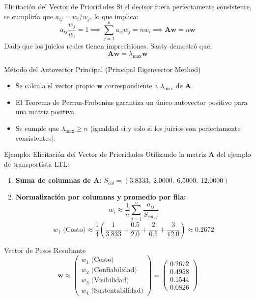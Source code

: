\documentclass[aspectratio=169, 10pt]{beamer}
\begin{document}
\begin{frame}{Elicitación del Vector de Prioridades}
    \small
    Si el decisor fuera perfectamente consistente, se cumpliría que $a_{ij} = w_i / w_j$, lo que implica:
    \[ a_{ij} \frac{w_j}{w_i} = 1 \implies \sum_{j=1}^n a_{ij} w_j = n w_i \implies \mathbf{A}\mathbf{w} = n\mathbf{w} \]
    Dado que los juicios reales tienen imprecisiones, Saaty demostró que:
    \[ \mathbf{A}\mathbf{w} = \lambda_{\max}\mathbf{w} \]
    \begin{block}{Método del Autovector Principal (Principal Eigenvector Method)}
        \scriptsize
        \begin{itemize}
            \item Se calcula el vector propio $\mathbf{w}$ correspondiente a $\lambda_{\max}$ de $\mathbf{A}$.
            \item El Teorema de Perron-Frobenius garantiza un único autovector positivo para una matriz positiva.
            \item Se cumple que $\lambda_{\max} \ge n$ (igualdad si y solo si los juicios son perfectamente consistentes).
        \end{itemize}
    \end{block}
\end{frame}

\begin{frame}{Ejemplo: Elicitación del Vector de Prioridades}
    Utilizando la matriz $\mathbf{A}$ del ejemplo de transportista LTL:
    \begin{enumerate}
        \item \textbf{Suma de columnas de $\mathbf{A}$:}
              $S_{col} = (3.8333, \ 2.0000, \ 6.5000, \ 12.0000)$
        \item \textbf{Normalización por columnas y promedio por fila:}
              \scriptsize
              \[ w_i \approx \frac{1}{n} \sum_{j=1}^n \frac{a_{ij}}{S_{col, j}} \]
              \[ w_1 \text{ (Costo)} \approx \frac{1}{4} \left( \frac{1}{3.833} + \frac{0.5}{2.0} + \frac{2}{6.5} + \frac{3}{12.0} \right) \approx 0.2672 \]
    \end{enumerate}
    \begin{block}{Vector de Pesos Resultante}
        \[ \mathbf{w} \approx \begin{pmatrix} w_1 \text{ (Costo)} \\ w_2 \text{ (Confiabilidad)} \\ w_3 \text{ (Visibilidad)} \\ w_4 \text{ (Sustentabilidad)} \end{pmatrix} = \begin{pmatrix} 0.2672 \\ 0.4958 \\ 0.1544 \\ 0.0826 \end{pmatrix} \]
    \end{block}
\end{frame}
\end{document}
